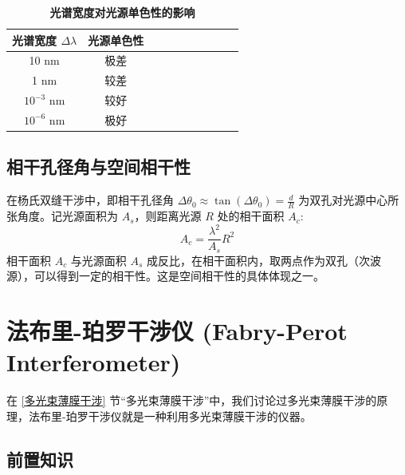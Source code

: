 \documentclass[UTF8]{report}
\theoremstyle{MyLineTheoremStyle} %
\theoremstyle{MyBlockTheoremStyle} %
\theoremstyle{MySubsubsectionStyle} %
\begin{document}
\begin{table}[H]\centering
    \caption{\textbf{光谱宽度对光源单色性的影响}}
    \label{光谱宽度对光源单色性的影响}
\begin{tabular}{cccccccccc}\toprule
    光谱宽度 $\Delta \lambda$ & 光源单色性  \\
    \midrule
    10 nm & 极差 \\
    1 nm &  较差 \\
    $10^{-3}$ nm & 较好 \\
    $10^{-6}$ nm & 极好 \\
    \bottomrule
\end{tabular}
\end{table}

\subsection{相干孔径角与空间相干性}

在杨氏双缝干涉中，即相干孔径角 $\Delta \theta_0 \approx \tan \left(\Delta \theta_0\right) = \frac{d}{R}$ 为双孔对光源中心所张角度。记光源面积为 $A_s$，则距离光源 $R$ 处的相干面积 $A_c$: 
\begin{equation}
A_c = \frac{\lambda^2}{A_s} R^2
\end{equation}
相干面积 $A_c$ 与光源面积 $A_s$ 成反比，在相干面积内，取两点作为双孔（次波源），可以得到一定的相干性。这是空间相干性的具体体现之一。

\section{法布里-珀罗干涉仪 (Fabry-Perot Interferometer)}

在 \ref{多光束薄膜干涉} 节“多光束薄膜干涉”中，我们讨论过多光束薄膜干涉的原理，法布里-珀罗干涉仪就是一种利用多光束薄膜干涉的仪器。

\subsection{前置知识}
\end{document}
